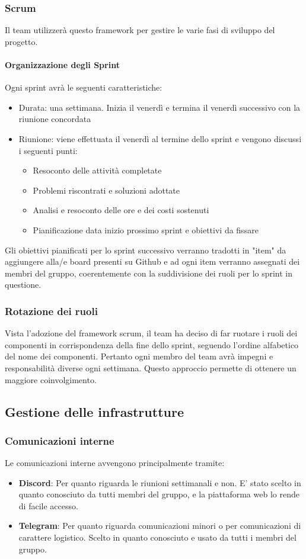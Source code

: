 \documentclass[12pt]{article}
\begin{document}
\subsubsection{Scrum}
Il team utilizzerà questo framework per gestire le varie fasi di sviluppo del progetto.
\paragraph{Organizzazione degli Sprint}
Ogni sprint avrà le seguenti caratteristiche:
\begin{itemize}
    \item Durata: una settimana. Inizia il venerdì e termina il venerdì successivo con la riunione concordata
    \item Riunione: viene effettuata il venerdì al termine dello sprint e vengono discussi i seguenti punti:
    \begin{itemize}
        \item Resoconto delle attività completate
        \item Problemi riscontrati e soluzioni adottate
        \item Analisi e resoconto delle ore e dei costi sostenuti
        \item Pianificazione data inizio prossimo sprint e obiettivi da fissare
    \end{itemize}
\end{itemize}
Gli obiettivi pianificati per lo sprint successivo verranno tradotti in "item" da aggiungere alla/e board presenti su Github e ad ogni item verranno assegnati dei membri del gruppo, coerentemente con la suddivisione dei ruoli per lo sprint in questione.

\subsubsection{Rotazione dei ruoli}
Vista l'adozione del framework scrum, il team ha deciso di far ruotare i ruoli dei componenti in corrispondenza della fine dello sprint, seguendo l'ordine alfabetico del nome dei componenti.
Pertanto ogni membro del team avrà impegni e responsabilità diverse ogni settimana. Questo approccio permette di ottenere un maggiore coinvolgimento.

\subsection{Gestione delle infrastrutture}
\subsubsection{Comunicazioni interne}
Le comunicazioni interne avvengono principalmente tramite:
\begin{itemize}
    \item \textbf{Discord}: Per quanto riguarda le riunioni settimanali e non. E' stato scelto in quanto conosciuto da tutti membri del gruppo, e la piattaforma web lo rende di facile accesso.
    \item \textbf{Telegram}: Per quanto riguarda comunicazioni minori o per comunicazioni di carattere logistico. Scelto in quanto conosciuto e usato da tutti i membri del gruppo.
\end{itemize}
\end{document}
